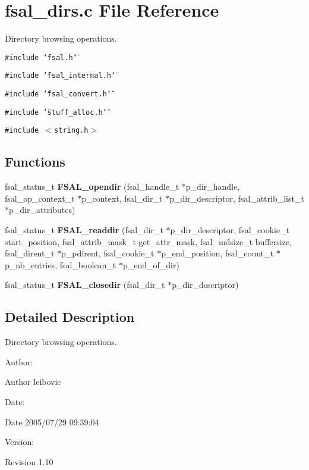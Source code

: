 \section{fsal\_\-dirs.c File Reference}
\label{fsal__dirs_8c}
Directory browsing operations.  


{\tt \#include \char`\"{}fsal.h\char`\"{}}\par
{\tt \#include \char`\"{}fsal\_\-internal.h\char`\"{}}\par
{\tt \#include \char`\"{}fsal\_\-convert.h\char`\"{}}\par
{\tt \#include \char`\"{}stuff\_\-alloc.h\char`\"{}}\par
{\tt \#include $<$string.h$>$}\par
\subsection*{Functions}
\begin{CompactItemize}
\item 
fsal\_\-status\_\-t {\bf FSAL\_\-opendir} (fsal\_\-handle\_\-t $\ast$p\_\-dir\_\-handle, fsal\_\-op\_\-context\_\-t $\ast$p\_\-context, fsal\_\-dir\_\-t $\ast$p\_\-dir\_\-descriptor, fsal\_\-attrib\_\-list\_\-t $\ast$p\_\-dir\_\-attributes)
\item 
fsal\_\-status\_\-t {\bf FSAL\_\-readdir} (fsal\_\-dir\_\-t $\ast$p\_\-dir\_\-descriptor, fsal\_\-cookie\_\-t start\_\-position, fsal\_\-attrib\_\-mask\_\-t get\_\-attr\_\-mask, fsal\_\-mdsize\_\-t buffersize, fsal\_\-dirent\_\-t $\ast$p\_\-pdirent, fsal\_\-cookie\_\-t $\ast$p\_\-end\_\-position, fsal\_\-count\_\-t $\ast$p\_\-nb\_\-entries, fsal\_\-boolean\_\-t $\ast$p\_\-end\_\-of\_\-dir)
\item 
fsal\_\-status\_\-t {\bf FSAL\_\-closedir} (fsal\_\-dir\_\-t $\ast$p\_\-dir\_\-descriptor)
\end{CompactItemize}


\subsection{Detailed Description}
Directory browsing operations. 

\begin{Desc}
\item[Author:]\end{Desc}
\begin{Desc}
\item[Author]leibovic \end{Desc}
\begin{Desc}
\item[Date:]\end{Desc}
\begin{Desc}
\item[Date]2005/07/29 09:39:04 \end{Desc}
\begin{Desc}
\item[Version:]\end{Desc}
\begin{Desc}
\item[Revision]1.10 \end{Desc}


